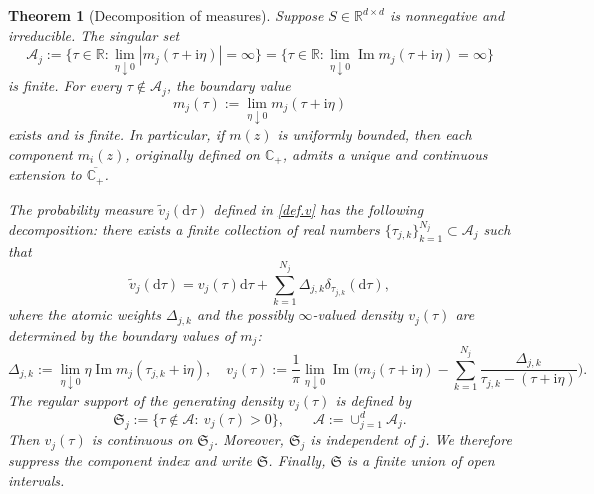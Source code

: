 \documentclass[11pt,twoside, a4paper]{article}
\numberwithin{equation}{section}
\numberwithin{figure}{section}
\theoremstyle{plain} %
\newtheorem{theorem}{Theorem}[section]
\theoremstyle{definition}
\theoremstyle{remark}
\newcommand{\1} {\mspace{1 mu}}
\newcommand{\2} {\mspace{2 mu}}
\newcommand{\R} {\mathbb{R}}
\newcommand{\Cp} {\mathbb {C}_+}
\newcommand{\dd}{\mathrm{d}}
\DeclareMathOperator{\im}{Im}
\begin{document}
\begin{theorem}[Decomposition of measures]\label{thm.decompose of measure}
  Suppose $S\in\R^{d\times d}$ is nonnegative and irreducible. 
  The singular set
  \[
  \mathcal A_j
  :=
  \Big\{\tau\in\mathbb R:
  \lim_{\eta\downarrow0}|m_j(\tau+\mathrm i\eta)|=\infty
  \Big\}
  =
  \Big\{\tau\in\mathbb R:
  \lim_{\eta\downarrow0}\im m_j(\tau+\mathrm i\eta)=\infty
  \Big\}
  \]
  is finite.
  For every $\tau\notin\mathcal{A}_j$, the boundary value
  \begin{equation}\label{def.mj}
     m_j(\tau):=\lim_{\eta\downarrow0}m_j(\tau+\mathrm i\eta)
  \end{equation}
  exists and is finite. In particular, if $m(z)$ is uniformly bounded, then each component \(m_i(z)\), originally defined on \(\Cp\), admits a unique and continuous extension to \(\overline{\Cp}\).

  The probability measure $\tilde{v}_j(\dd\tau)$ defined in \eqref{def.v} has the following decomposition: there exists a finite collection of real numbers $\{\tau_{j,k}\}_{k=1}^{N_j}\subset\mathcal{A}_j$ such that
  \begin{equation}\label{eq.measure-decomposition}
    \tilde{v}_j(\dd\tau)=v_j(\tau)\dd\tau+\sum_{k=1}^{N_j}\Delta_{j,k}\delta_{\tau_{j,k}}(\dd\tau),
  \end{equation}
  where the atomic weights $\Delta_{j,k}$ and the possibly $\infty$-valued density $v_j(\tau)$ are determined by the boundary values of \(m_j\):
  \begin{equation}\label{def.vj-Delta}
    \Delta_{j,k}:=\lim_{\eta\downarrow 0}\eta\im m_j(\tau_{j,k}+\mathrm i\eta),\quad v_j(\tau):=\frac{1}{\pi}\lim_{\eta\downarrow 0}\im \Big(m_j(\tau+\mathrm i\eta)-\sum_{k=1}^{N_j}\frac{\Delta_{j,k}}{\tau_{j,k}-(\tau+\mathrm i\eta)}\Big).
  \end{equation}
  The regular support of the generating density $v_j(\tau)$ is defined by
  \begin{equation}\label{def.Sj}
    \mathfrak{S}_j
    :=
    \bigl\{\tau\notin\mathcal{A}:~ v_j(\tau)>0\bigr\},\qquad \mathcal{A}:=\cup_{j=1}^d\mathcal{A}_j.
  \end{equation}
  Then $v_j(\tau)$ is continuous on $\mathfrak{S}_j$. Moreover, $\mathfrak{S}_j$ is independent of $j$. We therefore suppress the component index and write $\mathfrak{S}$. Finally, \(\mathfrak{S}\) is a finite union of open intervals.
\end{theorem}
\end{document}
